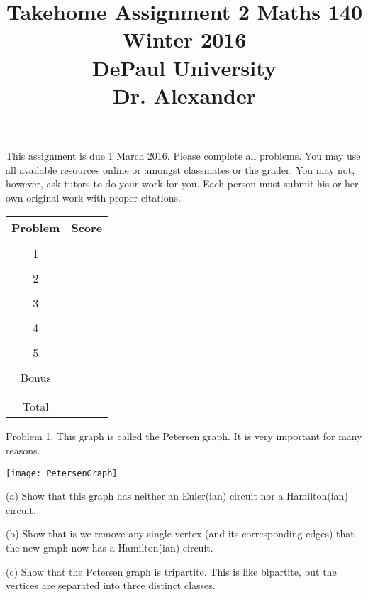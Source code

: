 \documentclass[16 pt]{amsart}
\theoremstyle{definition}
\theoremstyle{remark}
\numberwithin{equation}{subsection}
\begin{document}
\title{Takehome Assignment 2 Maths 140 Winter 2016 \\ DePaul University\\Dr. Alexander}
\maketitle
This assignment is due 1 March 2016.  Please complete all problems.  You may use all available resources online or amongst classmates or the grader.  You may not, however, ask tutors to do your work for you.  Each person must submit his or her own original work with proper citations.
\vspace{1in}


\begin{center}
  \begin{tabular}{ c | c }
    Problem & Score\\
    \hline
    &\\
    1&\\
    &\\
    2&\\
    &\\
    3&\\
    &\\
    4&\\
    &\\
    5&\\
    &\\
    Bonus&\\
    &\\
    \hline 
    &\\    
    Total& 
 \end{tabular}
\end{center}

\newpage 
Problem 1. This graph is called the Petersen graph.  It is very important for many reasons.
\begin{center}
\texttt{[image: PetersenGraph]}
\end{center}

(a) Show that this graph has neither an Euler(ian) circuit nor a Hamilton(ian) circuit.

\vspace{.25in}

(b) Show that is we remove any single vertex (and its corresponding edges) that the new graph now has a Hamilton(ian) circuit.

\vspace{.25in}

(c) Show that the Petersen graph is tripartite.  This is like bipartite, but the vertices are separated into three distinct classes.
\end{document}
